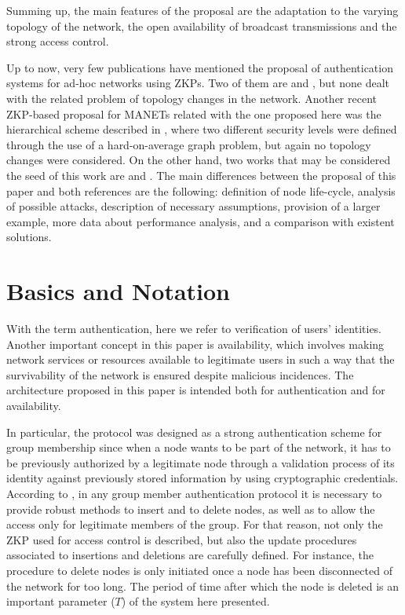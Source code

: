 \documentclass{article}
\begin{document}
Summing up, the
main features of the proposal are the adaptation to the
varying topology of the network, the open availability of
broadcast transmissions and the strong access control.

Up to now, very few
publications have  mentioned the proposal of authentication
systems for ad-hoc networks using ZKPs. Two of them are \cite{ARMF06} and
\cite{WZK05}, but none dealt with the related problem
of topology changes in the network. Another recent ZKP-based proposal for MANETs related with the one proposed
here was the hierarchical scheme described in \cite{CH06}, where two different security
levels were defined through the use of a hard-on-average graph
problem, but again no topology changes were considered. On the other hand,  two works that may be considered the seed of this work are  \cite{CC07} and \cite{CCMQ07}. The main differences between the proposal of this paper and both references are the following:  definition of node life-cycle, analysis of possible attacks,  description of necessary assumptions,  provision of a larger example, more data about performance analysis, and a comparison with existent solutions.

\section{Basics and Notation}
\label{Overview}
\label{BasicsandNotation}

With the term authentication, here we refer to  verification  of users' identities. Another important concept in this paper is availability, which involves making network services or resources available to  legitimate users in such a way that the survivability of the network is ensured despite malicious incidences. The  architecture proposed in this paper is intended both for authentication and for availability.

In particular, the protocol was designed as a strong authentication scheme for
group membership since when a node wants to be part of the
network, it has to be previously authorized by a legitimate node through a validation process of its identity against previously stored information by using cryptographic credentials.  
According to \cite{MAH00}, in any group member
authentication protocol it is necessary to provide robust methods
to insert and to delete nodes, as well as to allow the access only
for legitimate members of the group. For that reason, not only the
ZKP used for access control is described, but also the
update procedures associated to insertions and deletions are
carefully defined. For instance, the procedure to delete nodes is only initiated once a node has been
disconnected of the network for too long. The period of time after which the node is deleted is an important parameter ($T$) of the system here presented.
\end{document}
